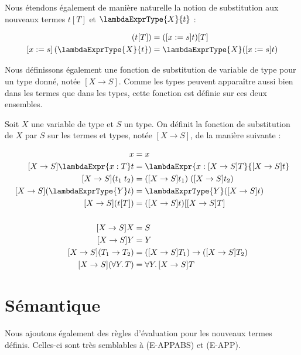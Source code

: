 Nous étendons également de manière naturelle la notion de substitution aux
nouveaux termes $t[T]$ et $\lambdaExprType{X}{t}$ :

\begin{align*}
  [x := s] \, (t[T]) & = ([x := s]t)[T] \\
  [x := s] \, (\lambdaExprType{X}{t}) & = \lambdaExprType{X}([x := s]t)
\end{align*}

Nous définissons également une fonction de substitution de variable de type pour
un type donné, notée $[X \rightarrow S]$. Comme les types peuvent apparaître
aussi bien dans les termes que dans les types, cette fonction est définie sur
ces deux ensembles.

\begin{definition}
  Soit $X$ une variable de type et $S$ un type. On définit la fonction de
  substitution de $X$ par $S$ sur les termes et types, notée $[X \rightarrow S]$,
  de la manière suivante :

  \begin{align*}
    [X \rightarrow S]x & = x \\
    [X \rightarrow S]\lambdaExpr{x : T} t & = \lambdaExpr{x : [X \rightarrow S]T}{[X \rightarrow S]t} \\
    [X \rightarrow S](t_{1} \; t_{2}) & = ([X \rightarrow S]t_{1}) \; ([X \rightarrow S]t_{2}) \\
    [X \rightarrow S](\lambdaExprType{Y} t) & = \lambdaExprType{Y}([X \rightarrow S] t) \\
    [X \rightarrow S](t[T]) & = ([X \rightarrow S] t)[[X \rightarrow S] T] \\
    \\
    [X \rightarrow S]X & = S \\
    [X \rightarrow S]Y & = Y \\
    [X \rightarrow S](T_{1} \rightarrow T_{2}) & = ([X \rightarrow S]T_{1}) \rightarrow ([X \rightarrow S] T_{2}) \\
    [X \rightarrow S](\forall Y .\, T) & = \forall Y . \, [X \rightarrow S]T
  \end{align*}
\end{definition}
\section{Sémantique}

Nous ajoutons également des règles d'évaluation pour les nouveaux termes
définis. Celles-ci sont très semblables à (E-APPABS) et (E-APP).


